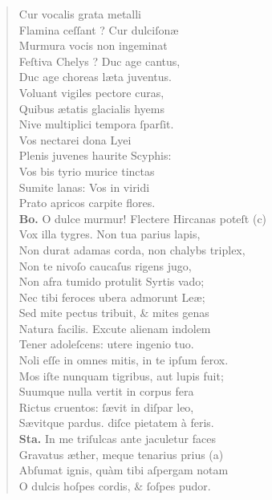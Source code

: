 \documentclass[a4paper,12pt]{article}
\begin{document}
\begin{verse}
Cur vocalis grata metalli\\[0pt]
Flamina ceſſant ? Cur dulciſonæ\\[0pt]
Murmura vocis non ingeminat\\[0pt]
Feſtiva Chelys ? Duc age cantus,\\[0pt]
Duc age choreas læta juventus.\\[0pt]
Voluant vigiles pectore curas,\\[0pt]
Quibus ætatis glacialis hyems\\[0pt]
Nive multiplici tempora ſparſit.\\[0pt]
Vos nectarei dona Lyei\\[0pt]
Plenis juvenes haurite Scyphis:\\[0pt]
Vos bis tyrio murice tinctas\\[0pt]
Sumite lanas: Vos in viridi\\[0pt]
Prato apricos carpite flores.\\[0pt]
\textbf{Bo.} O dulce murmur! Flectere Hircanas poteſt (c)\footnotemark\\[0pt]
Vox illa tygres. Non tua parius lapis,\\[0pt]
Non durat adamas corda, non chalybs triplex,\\[0pt]
Non te nivoſo caucaſus rigens jugo,\\[0pt]
Non afra tumido protulit Syrtis vado;\\[0pt]
Nec tibi feroces ubera admorunt Leæ;\\[0pt]
Sed mite pectus tribuit, \& mites genas\\[0pt]
Natura facilis. Excute alienam indolem\\[0pt]
Tener adoleſcens: utere ingenio tuo.\\[0pt]
Noli eſſe in omnes mitis, in te ipſum ferox.\\[0pt]
Mos iſte nunquam tigribus, aut lupis fuit;\\[0pt]
Suumque nulla vertit in corpus fera\\[0pt]
Rictus cruentos: ſævit in diſpar leo,\\[0pt]
Sævitque pardus. diſce pietatem à feris.\\[0pt]
\textbf{Sta.} In me triſulcas ante jaculetur faces\\[0pt]
Gravatus æther, meque tenarius prius (a)\footnotemark\\[0pt]
Abſumat ignis, quàm tibi aſpergam notam\\[0pt]
O dulcis hoſpes cordis, \& ſoſpes pudor.\\[0pt]

\end{verse}
\end{document}
